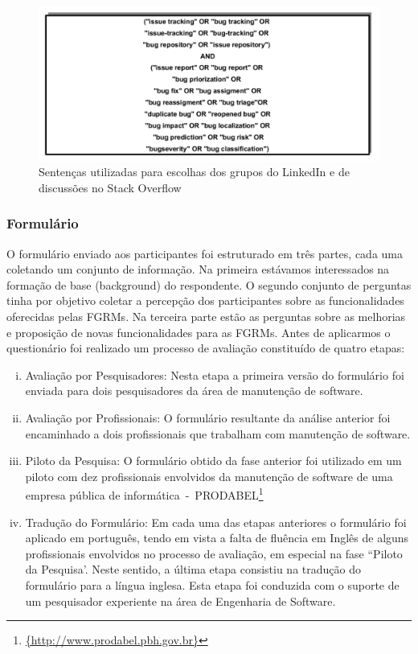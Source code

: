 \begin{figure}[htpb]
	\centering
	\includegraphics[width=0.6\linewidth]{./chapter-pesquisa-com-profissionais/img/setencas-grupos.pdf}
	\caption{Sentenças utilizadas para escolhas dos grupos do LinkedIn e de
		discussões no Stack Overflow}
\label{fig:setencas-grupos}
\end{figure}

\subsubsection{Formulário}
\label{subsubsec:questionario}

O formulário enviado aos participantes foi estruturado em três partes, cada uma
coletando um conjunto de informação. Na primeira estávamos interessados na
formação de base (background) do respondente. O segundo conjunto de perguntas
tinha por objetivo coletar a percepção dos participantes sobre as
funcionalidades oferecidas pelas FGRMs\@. Na terceira parte estão as perguntas
sobre as melhorias e proposição de novas funcionalidades para as FGRMs. Antes de
aplicarmos o questionário foi realizado um processo de avaliação constituído de
quatro etapas:

\begin{enumerate}[(i)]
	\item Avaliação por Pesquisadores: Nesta etapa a primeira versão do
		formulário foi enviada para dois pesquisadores da área de manutenção de
		software.
	\item Avaliação por Profissionais: O formulário resultante da análise
		anterior foi encaminhado a dois profissionais que trabalham com
		manutenção de software.
	\item Piloto da Pesquisa: O formulário obtido da fase anterior foi utilizado
		em um piloto com dez profissionais envolvidos da manutenção de software
		de uma empresa pública de
		informática~-~PRODABEL\footnote{\url{{http://www.prodabel.pbh.gov.br}}}
	\item Tradução do Formulário: Em cada uma das etapas anteriores o
		formulário foi aplicado em português, tendo em vista a falta de fluência
		em Inglês de alguns profissionais envolvidos no processo de avaliação,
		em especial na fase ``Piloto da Pesquisa'. Neste sentido, a última etapa
		consistiu na tradução do formulário para a língua inglesa. Esta etapa
		foi conduzida com  o suporte de um pesquisador experiente na área de
		Engenharia de Software.
\end{enumerate}

